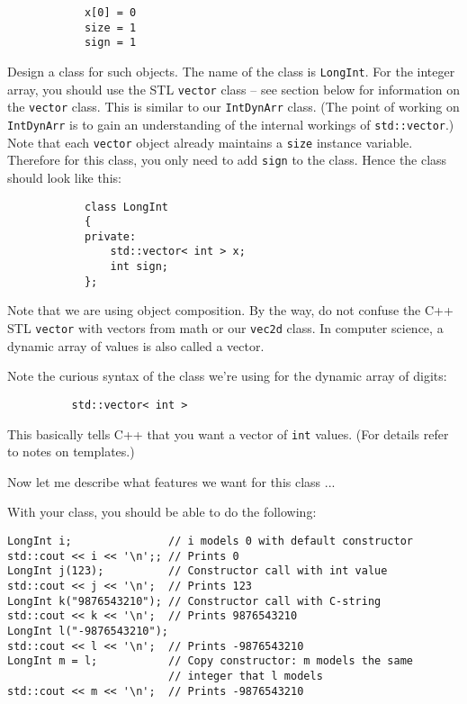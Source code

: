 \begin{Verbatim}
            x[0] = 0
            size = 1
            sign = 1
\end{Verbatim}

Design a class for such objects. The name of the class is \verb!LongInt!. 
For the integer array, you should use the STL \verb!vector! class – see 
section below for information on the \verb!vector! class. This is similar 
to our \verb!IntDynArr! class. (The point of working on \verb!IntDynArr! 
is to gain an understanding of the internal workings of \verb!std::vector!.) 
Note that each \verb!vector! object already maintains a \verb!size! instance 
variable. Therefore for this class, you only need to add \verb!sign! to the 
class. Hence the class should look like this:

\begin{Verbatim}
            class LongInt
            {
            private:
                std::vector< int > x;
                int sign;
            };
\end{Verbatim}

Note that we are using object composition. By the way, do not confuse the 
C++ STL \verb!vector! with vectors from math or our \verb!vec2d! class. 
In computer science, a dynamic array of values is also called a vector.

Note the curious syntax of the class we're using for the dynamic array 
of digits:

\verb!          std::vector< int >!

This basically tells C++ that you want a vector of \verb!int! values. 
(For details refer to notes on templates.)

Now let me describe what features we want for this class ...

With your class, you should be able to do the following:

\begin{Verbatim}[frame=single,fontsize=\footnotesize]
LongInt i;               // i models 0 with default constructor
std::cout << i << '\n';; // Prints 0
LongInt j(123);          // Constructor call with int value
std::cout << j << '\n';  // Prints 123
LongInt k("9876543210"); // Constructor call with C-string
std::cout << k << '\n';  // Prints 9876543210
LongInt l("-9876543210");
std::cout << l << '\n';  // Prints -9876543210
LongInt m = l;           // Copy constructor: m models the same
                         // integer that l models
std::cout << m << '\n';  // Prints -9876543210
\end{Verbatim}

